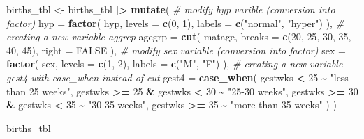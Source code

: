 \documentclass[
]{book}
\newenvironment{Shaded}{\begin{snugshade}}{\end{snugshade}}
\newcommand{\AttributeTok}[1]{\textcolor[rgb]{0.13,0.29,0.53}{#1}}
\newcommand{\CommentTok}[1]{\textcolor[rgb]{0.56,0.35,0.01}{\textit{#1}}}
\newcommand{\ConstantTok}[1]{\textcolor[rgb]{0.56,0.35,0.01}{#1}}
\newcommand{\DecValTok}[1]{\textcolor[rgb]{0.00,0.00,0.81}{#1}}
\newcommand{\FunctionTok}[1]{\textcolor[rgb]{0.13,0.29,0.53}{\textbf{#1}}}
\newcommand{\NormalTok}[1]{#1}
\newcommand{\OtherTok}[1]{\textcolor[rgb]{0.56,0.35,0.01}{#1}}
\newcommand{\SpecialCharTok}[1]{\textcolor[rgb]{0.81,0.36,0.00}{\textbf{#1}}}
\newcommand{\StringTok}[1]{\textcolor[rgb]{0.31,0.60,0.02}{#1}}
\theoremstyle{definition}
\theoremstyle{definition}
\theoremstyle{definition}
\theoremstyle{definition}
\theoremstyle{remark}
\begin{document}
\begin{Shaded}
\begin{Highlighting}[]
\NormalTok{births\_tbl }\OtherTok{\textless{}{-}}
\NormalTok{  births\_tbl }\SpecialCharTok{|\textgreater{}}
  \FunctionTok{mutate}\NormalTok{(}
    \CommentTok{\# modify hyp varible (conversion into factor)}
    \AttributeTok{hyp =} 
      \FunctionTok{factor}\NormalTok{(}
\NormalTok{        hyp, }
        \AttributeTok{levels =} \FunctionTok{c}\NormalTok{(}\DecValTok{0}\NormalTok{, }\DecValTok{1}\NormalTok{), }
        \AttributeTok{labels =} \FunctionTok{c}\NormalTok{(}\StringTok{"normal"}\NormalTok{, }\StringTok{"hyper"}\NormalTok{)}
\NormalTok{      ),}
    \CommentTok{\# creating a new variable aggrep}
    \AttributeTok{agegrp =} 
      \FunctionTok{cut}\NormalTok{(}
\NormalTok{        matage, }
        \AttributeTok{breaks =} \FunctionTok{c}\NormalTok{(}\DecValTok{20}\NormalTok{, }\DecValTok{25}\NormalTok{, }\DecValTok{30}\NormalTok{, }\DecValTok{35}\NormalTok{, }\DecValTok{40}\NormalTok{, }\DecValTok{45}\NormalTok{), }
        \AttributeTok{right =} \ConstantTok{FALSE}
\NormalTok{      ),}
    \CommentTok{\# modify sex variable (conversion into factor)}
    \AttributeTok{sex =} 
      \FunctionTok{factor}\NormalTok{(}
\NormalTok{        sex, }
        \AttributeTok{levels =} \FunctionTok{c}\NormalTok{(}\DecValTok{1}\NormalTok{, }\DecValTok{2}\NormalTok{), }
        \AttributeTok{labels =} \FunctionTok{c}\NormalTok{(}\StringTok{"M"}\NormalTok{, }\StringTok{"F"}\NormalTok{)}
\NormalTok{      ),}
    \CommentTok{\# creating a new variable gest4 with case\_when instead of cut}
    \AttributeTok{gest4 =}
      \FunctionTok{case\_when}\NormalTok{(}
\NormalTok{        gestwks }\SpecialCharTok{\textless{}} \DecValTok{25} \SpecialCharTok{\textasciitilde{}} \StringTok{"less than 25 weeks"}\NormalTok{,}
\NormalTok{        gestwks }\SpecialCharTok{\textgreater{}=} \DecValTok{25} \SpecialCharTok{\&}\NormalTok{ gestwks }\SpecialCharTok{\textless{}} \DecValTok{30} \SpecialCharTok{\textasciitilde{}} \StringTok{"25{-}30 weeks"}\NormalTok{,}
\NormalTok{        gestwks }\SpecialCharTok{\textgreater{}=} \DecValTok{30} \SpecialCharTok{\&}\NormalTok{ gestwks }\SpecialCharTok{\textless{}} \DecValTok{35} \SpecialCharTok{\textasciitilde{}} \StringTok{"30{-}35 weeks"}\NormalTok{,}
\NormalTok{        gestwks }\SpecialCharTok{\textgreater{}=} \DecValTok{35} \SpecialCharTok{\textasciitilde{}} \StringTok{"more than 35 weeks"}
\NormalTok{      )}
\NormalTok{  )}

\NormalTok{births\_tbl}
\end{Highlighting}
\end{Shaded}
\end{document}
